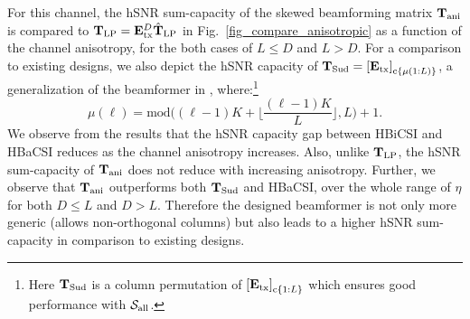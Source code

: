 \documentclass[journal,comsoc]{IEEEtran}
\begin{document}
%
For this channel, the hSNR sum-capacity of the skewed beamforming matrix $\mathbf{T}_{\rm ani}$ is compared to $\mathbf{T}_{\rm LP} = \mathbf{E}^D_{\rm tx} \hat{\mathbf{T}}_{\rm LP}$ in Fig.~\ref{fig_compare_anisotropic} as a function of the channel anisotropy, for the both cases of $L \leq D$ and $L > D$. For a comparison to existing designs, we also depict the hSNR capacity of $\mathbf{T}_{\rm Sud} = {[\mathbf{E}_{\rm tx}]}_{{\rm c}\{ \mu(1:L)\}}$, a generalization of the beamformer in \cite{Sudarshan}, where:\footnote{Here $\mathbf{T}_{\rm Sud}$ is a column permutation of ${[\mathbf{E}_{\rm tx}]}_{{\rm c}\{ 1:L\}}$ which ensures good performance with $\mathcal{S}_{\rm all}$.}
$$\mu(\ell) = \text{mod} \bigg( (\ell-1)K + \Big\lfloor \frac{(\ell-1)K}{L} \Big\rfloor, L\bigg) + 1. $$
We observe from the results that the hSNR capacity gap between HBiCSI and HBaCSI reduces as the channel anisotropy increases. Also, unlike $\mathbf{T}_{\rm LP}$, the hSNR sum-capacity of $\mathbf{T}_{\rm ani}$ does not reduce with increasing anisotropy. Further, we observe that $\mathbf{T}_{\rm ani}$ outperforms both $\mathbf{T}_{\rm Sud}$ and HBaCSI, over the whole range of $\eta$ for both $D \leq L$ and $D > L$. Therefore the designed beamformer is not only more generic (allows non-orthogonal columns) but also leads to a higher hSNR sum-capacity in comparison to existing designs.
%
%
\end{document}
